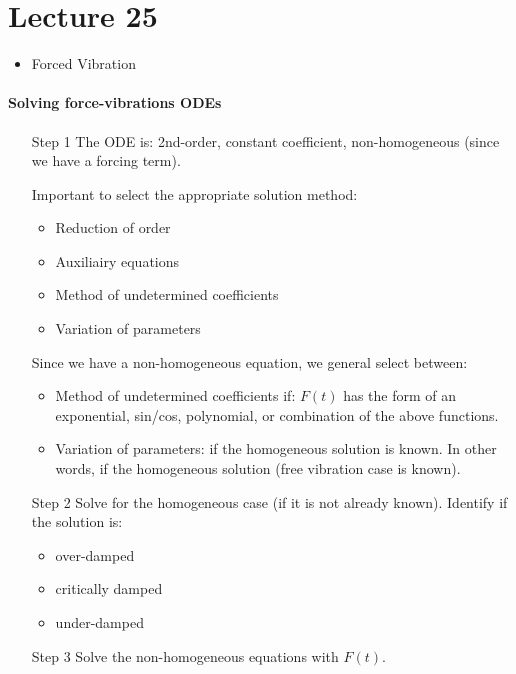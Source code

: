 \chapter*{Lecture 25}
\begin{recall}{}{}
\begin{itemize}
\item Forced Vibration
\end{itemize}
\end{recall}




\subsubsection{Solving force-vibrations ODEs}
\begin{itemize}
\item[Step 1] The ODE is: 2nd-order, constant coefficient, non-homogeneous (since we have a forcing term).

Important to select the appropriate solution method:
\begin{itemize}
\item Reduction of order
\item Auxiliairy equations
\item Method of undetermined coefficients
\item Variation of parameters 
\end{itemize}
Since we have a non-homogeneous equation, we general select between:
\begin{itemize}
\item Method of undetermined coefficients if: $F(t)$ has the form of an exponential, sin/cos, polynomial, or combination of the above functions.
\item Variation of parameters: if the homogeneous solution is known. In other words, if the homogeneous solution (free vibration case is known).
\end{itemize}
\item[Step 2] Solve for the homogeneous case (if it is not already known). Identify if the solution is:
\begin{itemize}
\item over-damped
\item critically damped
\item under-damped
\end{itemize}
\item[Step 3] Solve the non-homogeneous equations with $F(t)$.
\end{itemize}




